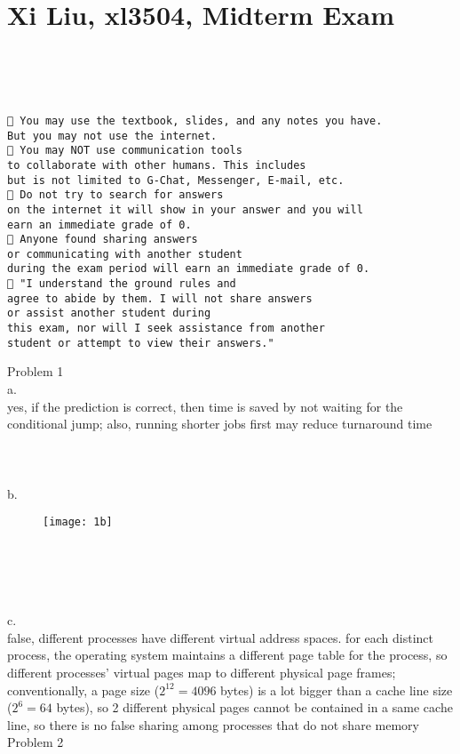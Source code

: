 \documentclass[12pt,border=4pt,multi]{article}%
\begin{document}
\section*{Xi Liu, xl3504, Midterm Exam}
\leavevmode
\\
\\
\\
\begin{verbatim}
 You may use the textbook, slides, and any notes you have.
But you may not use the internet. 
 You may NOT use communication tools 
to collaborate with other humans. This includes 
but is not limited to G-Chat, Messenger, E-mail, etc. 
 Do not try to search for answers
on the internet it will show in your answer and you will 
earn an immediate grade of 0. 
 Anyone found sharing answers 
or communicating with another student
during the exam period will earn an immediate grade of 0. 
 "I understand the ground rules and
agree to abide by them. I will not share answers 
or assist another student during 
this exam, nor will I seek assistance from another 
student or attempt to view their answers." 
\end{verbatim}
\newpage
\noindent
Problem 1\\
a.\\
yes, if the prediction is correct, then time is saved by not waiting for the conditional jump; also, running shorter jobs first may reduce turnaround time\\
\\
\\
\\
b.
\begin{figure}[h!]
	\centering
	\texttt{[image: 1b]} %
\end{figure}\\
\\
\\
\\
c.\\
false, different processes have different virtual address spaces. for each distinct process, the operating system maintains a different page table for the process, so different processes' virtual pages map to different physical page frames; conventionally, a page size ($2^{12} = 4096$ bytes) is a lot bigger than a cache line size ($2^6 = 64$ bytes), so 2 different physical pages cannot be contained in a same cache line, so there is no false sharing among processes that do not share memory\\
\newpage
\noindent
Problem 2\\
\end{document}
